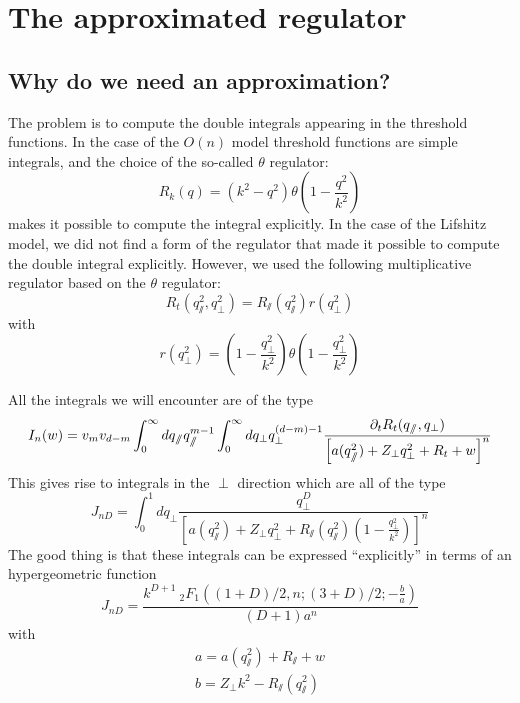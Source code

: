 \chapter{The approximated regulator}

\section{Why do we need an approximation?}

The problem is to compute the double integrals appearing in the threshold functions. 
In the case of the $O(n)$ model threshold functions are simple integrals, and the choice of the so-called $\theta$ regulator:
\begin{equation}
R_k(q) = (k^2 - q^2) \theta\left(1-\frac{q^2}{k^2}\right) 
\end{equation}
makes it possible to compute the integral explicitly. 
In the case of the Lifshitz model, we did not find a form of the regulator that made it possible to compute the double integral explicitly. 
However, we used the following multiplicative regulator based on the $\theta$ regulator:
\begin{equation}
R_t(q_\sslash^2, q_\perp^2) = R_\sslash(q_\sslash^2) r(q_\perp^2)
\end{equation}
with
\begin{equation}
r(q_\perp^2) = \left( 1 -\frac{q_\perp^2}{k^2} \right) \theta\left(1-\frac{q_\perp^2}{k^2} \right)
\end{equation}

All the integrals we will encounter are of the type
\begin{equation}
I_n(w) = v_m v_{d-m} \int_0^{\infty} dq_\sslash q_\sslash^{m-1} \int_0^{\infty} dq_\perp q_\perp^{(d-m)-1} \frac{\partial_{t} R_t(q_\sslash, q_\perp)}{\left[ a(q_\sslash^2) + Z_\perp q_\perp^2 + R_t + w \right]^n}
\end{equation}
This gives rise to integrals in the $\perp$ direction which are all of the type
\begin{equation}
J_{nD} = \int_0^{1} dq_\perp \frac{q_\perp^D}{\left[ a(q_\sslash^2) + Z_\perp q_\perp^2 + R_\sslash(q_\sslash^2) \left(1-\frac{q_\perp^2}{k^2} \right) \right]^n}
\end{equation}
The good thing is that these integrals can be expressed ``explicitly'' in terms of an hypergeometric function
\begin{equation}
J_{nD} = \frac{k^{D+1} \ _2F_1\left((1+D)/2,n;(3+D)/2;-\frac{b}{a}\right)}{(D+1)a^{n}}
\end{equation}
with
\begin{align}
a = a(q_\sslash^2) + R_\sslash + w \\
b = Z_\perp k^2 - R_\sslash(q_\sslash^2)
\end{align}

